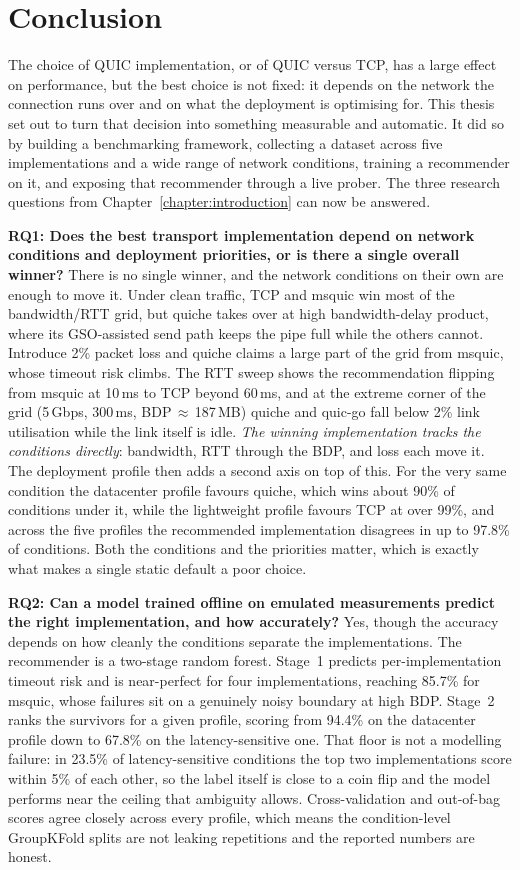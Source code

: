 \chapter{Conclusion}
\label{chapter:conclusion}

The choice of QUIC implementation, or of QUIC versus TCP, has a large effect on
performance, but the best choice is not fixed: it depends on the network the
connection runs over and on what the deployment is optimising for. This thesis
set out to turn that decision into something measurable and automatic. It did so
by building a benchmarking framework, collecting a dataset across five
implementations and a wide range of network conditions, training a recommender
on it, and exposing that recommender through a live prober. The three research
questions from Chapter~\ref{chapter:introduction} can now be answered.

\textbf{RQ1: Does the best transport implementation depend on network conditions
and deployment priorities, or is there a single overall winner?} There is no
single winner, and the network conditions on their own are enough to move it.
Under clean traffic, TCP and msquic win most of the bandwidth/RTT grid, but
quiche takes over at high bandwidth-delay product, where its GSO-assisted send
path keeps the pipe full while the others cannot. Introduce 2\% packet loss and
quiche claims a large part of the grid from msquic, whose timeout risk climbs.
The RTT sweep shows the recommendation flipping from msquic at 10\,ms to TCP
beyond 60\,ms, and at the extreme corner of the grid (5\,Gbps, 300\,ms,
BDP\,$\approx$\,187\,MB) quiche and quic-go fall below 2\% link utilisation while
the link itself is idle. \emph{The winning implementation tracks the conditions
directly}: bandwidth, RTT through the BDP, and loss each move it. The deployment
profile then adds a second axis on top of this. For the very same condition the
datacenter profile favours quiche, which wins about 90\% of conditions under it,
while the lightweight profile favours TCP at over 99\%, and across the five
profiles the recommended implementation disagrees in up to 97.8\% of conditions.
Both the conditions and the priorities matter, which is exactly what makes a
single static default a poor choice.

\textbf{RQ2: Can a model trained offline on emulated measurements predict the
right implementation, and how accurately?} Yes, though the accuracy depends on
how cleanly the conditions separate the implementations. The recommender is a
two-stage random forest. Stage~1 predicts per-implementation timeout risk and is
near-perfect for four implementations, reaching 85.7\% for msquic, whose
failures sit on a genuinely noisy boundary at high BDP. Stage~2 ranks the
survivors for a given profile, scoring from 94.4\% on the datacenter profile
down to 67.8\% on the latency-sensitive one. That floor is not a modelling
failure: in 23.5\% of latency-sensitive conditions the top two implementations
score within 5\% of each other, so the label itself is close to a coin flip and
the model performs near the ceiling that ambiguity allows. Cross-validation and
out-of-bag scores agree closely across every profile, which means the
condition-level GroupKFold splits are not leaking repetitions and the reported
numbers are honest.

